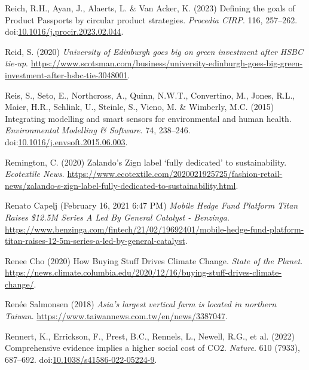 \documentclass[
  letterpaper,
  DIV=11,
  numbers=noendperiod]{scrartcl}
\newlength{\cslhangindent}
\newenvironment{CSLReferences}[2] %
 {\begin{list}{}{%
  \setlength{\itemindent}{0pt}
  \setlength{\leftmargin}{0pt}
  \setlength{\parsep}{0pt}
  \ifodd #1
   \setlength{\leftmargin}{\cslhangindent}
   \setlength{\itemindent}{-1\cslhangindent}
  \fi
  \setlength{\itemsep}{#2\baselineskip}}}
 {\end{list}}
\begin{document}
\begin{CSLReferences}{0}{1}
Reich, R.H., Ayan, J., Alaerts, L. \& Van Acker, K. (2023) Defining the
goals of {Product Passports} by circular product strategies.
\emph{Procedia CIRP}. 116, 257--262.
doi:\href{https://doi.org/10.1016/j.procir.2023.02.044}{10.1016/j.procir.2023.02.044}.

Reid, S. (2020) \emph{University of {Edinburgh} goes big on green
investment after {HSBC} tie-up}.
\url{https://www.scotsman.com/business/university-edinburgh-goes-big-green-investment-after-hsbc-tie-3048001}.

Reis, S., Seto, E., Northcross, A., Quinn, N.W.T., Convertino, M.,
Jones, R.L., Maier, H.R., Schlink, U., Steinle, S., Vieno, M. \&
Wimberly, M.C. (2015) Integrating modelling and smart sensors for
environmental and human health. \emph{Environmental Modelling \&
Software}. 74, 238--246.
doi:\href{https://doi.org/10.1016/j.envsoft.2015.06.003}{10.1016/j.envsoft.2015.06.003}.

Remington, C. (2020) Zalando's {Zign} label {`fully dedicated'} to
sustainability. \emph{Ecotextile News}.
\url{https://www.ecotextile.com/2020021925725/fashion-retail-news/zalando-s-zign-label-fully-dedicated-to-sustainability.html}.

Renato Capelj (February 16, 2021 6:47 PM) \emph{Mobile {Hedge Fund
Platform Titan Raises} \$12.{5M Series A Led By General Catalyst} -
{Benzinga}}.
\url{https://www.benzinga.com/fintech/21/02/19692401/mobile-hedge-fund-platform-titan-raises-12-5m-series-a-led-by-general-catalyst}.

Renee Cho (2020) How {Buying Stuff Drives Climate Change}. \emph{State
of the Planet}.
\url{https://news.climate.columbia.edu/2020/12/16/buying-stuff-drives-climate-change/}.

Renée Salmonsen (2018) \emph{Asia's largest vertical farm is located in
northern {Taiwan}}. \url{https://www.taiwannews.com.tw/en/news/3387047}.

Rennert, K., Errickson, F., Prest, B.C., Rennels, L., Newell, R.G., et
al. (2022) Comprehensive evidence implies a higher social cost of {CO2}.
\emph{Nature}. 610 (7933), 687--692.
doi:\href{https://doi.org/10.1038/s41586-022-05224-9}{10.1038/s41586-022-05224-9}.


\end{CSLReferences}
\end{document}
